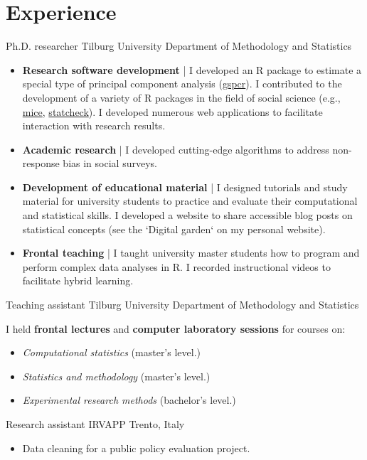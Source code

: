 \section{Experience}

{Ph.D. researcher}
{Tilburg University} %
{} %
{Department of Methodology and Statistics}   %
{
    \vspace{0.1em}
    \begin{spacing}{1.1}
    \begin{itemize}
        \item \textbf{Research software development} | I developed an R package to estimate a special type of principal component analysis 
        (\href{https://github.com/EdoardoCostantini/gspcr}{gspcr}). I contributed to the development of a variety of R packages in the field of social science (e.g., \href{https://github.com/amices/mice/pull/438}{mice}, \href{https://github.com/MicheleNuijten/statcheck}{statcheck}). I developed numerous web applications to facilitate interaction with research results.
        \item \textbf{Academic research} | I developed cutting-edge algorithms to address non-response bias in social surveys.
        \item \textbf{Development of educational material} | I designed tutorials and study material for university students to practice and evaluate their computational and statistical skills. I developed a website to share accessible blog posts on statistical concepts (see the `Digital garden` on my personal website).
        \item \textbf{Frontal teaching} | I taught university master students how to program and perform complex data analyses in R. I recorded instructional videos to facilitate hybrid learning.
    \end{itemize}
    \end{spacing}
    \vspace{1em}
}

{Teaching assistant}
{Tilburg University} %
{} %
{Department of Methodology and Statistics}   %
{
    \vspace{0.1em}
    \begin{spacing}{1.1}
    I held \textbf{frontal lectures} and \textbf{computer laboratory sessions} for courses on:
    \begin{itemize}
        \item \textit{Computational statistics} (master's level.)
		\item \textit{Statistics and methodology} (master's level.)
		\item \textit{Experimental research methods} (bachelor's level.)
    \end{itemize}
    \end{spacing}
    \vspace{1em}
}

{Research assistant}
{IRVAPP} %
{Trento, Italy} %
{}   %
{
    \vspace{0.1em}
    \begin{itemize}
        \item Data cleaning for a public policy evaluation project.
    \end{itemize}
}

